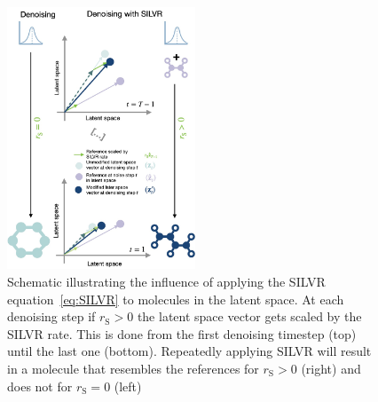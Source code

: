 \documentclass[journal=jacsat,manuscript=article]{achemso}
\begin{document}
\begin{figure}
    \centering
    \includegraphics[width=0.5\textwidth]{paper/Figures/Fig2/fig2.jpg}
    \caption{Schematic illustrating the influence of applying the SILVR equation~\ref{eq:SILVR} to molecules in the latent space. At each denoising step if $r_{\mathrm{S}}>0$ the latent space vector gets scaled by the SILVR rate. This is done from the first denoising timestep (top) until the last one (bottom). Repeatedly applying SILVR will result in a molecule that resembles the references for $r_{\mathrm{S}}>0$ (right) and does not for $r_{\mathrm{S}}=0$ (left)}
    \label{fig:silvr_explanation}
\end{figure}
\end{document}
